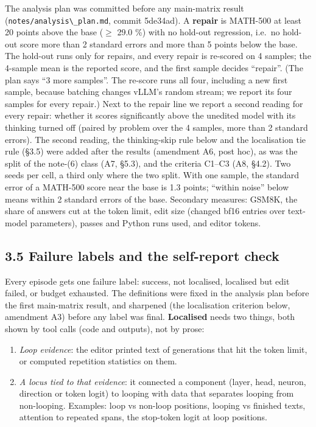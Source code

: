 \documentclass[
  10pt,
]{article}
\newcommand{\passthrough}[1]{#1}
\providecommand{\tightlist}{%
  \setlength{\itemsep}{0pt}\setlength{\parskip}{0pt}}
\begin{document}
The analysis plan was committed before any main-matrix result
(\passthrough{\lstinline!notes/analysis\_plan.md!}, commit 5de34ad). A
\textbf{repair} is MATH-500 at least 20 points above the base (\ensuremath{\geq} 29.0
\%) with no hold-out regression, i.e.~no hold-out score more than 2
standard errors and more than 5 points below the base. The hold-out runs
only for repairs, and every repair is re-scored on 4 samples; the
4-sample mean is the reported score, and the first sample decides
``repair''. (The plan says ``3 more samples''. The re-score runs all
four, including a new first sample, because batching changes vLLM's
random stream; we report its four samples for every repair.) Next to the
repair line we report a second reading for every repair: whether it
scores significantly above the unedited model with its thinking turned
off (paired by problem over the 4 samples, more than 2 standard errors).
The second reading, the thinking-skip rule below and the localisation
tie rule (\S{}3.5) were added after the results (amendment A6, post hoc),
as was the split of the note-(6) class (A7, \S{}5.3), and the criteria
C1--C3 (A8, \S{}4.2). Two seeds per cell, a third only where the two split.
With one sample, the standard error of a MATH-500 score near the base is
1.3 points; ``within noise'' below means within 2 standard errors of the
base. Secondary measures: GSM8K, the share of answers cut at the token
limit, edit size (changed bf16 entries over text-model parameters),
passes and Python runs used, and editor tokens.

\subsection{3.5 Failure labels and the self-report
check}\label{failure-labels-and-the-self-report-check}

Every episode gets one failure label: success, not localised, localised
but edit failed, or budget exhausted. The definitions were fixed in the
analysis plan before the first main-matrix result, and sharpened (the
localisation criterion below, amendment A3) before any label was final.
\textbf{Localised} needs two things, both shown by tool calls (code and
outputs), not by prose:

\begin{enumerate}
\def\labelenumi{\arabic{enumi}.}
\tightlist
\item
  \emph{Loop evidence}: the editor printed text of generations that hit
  the token limit, or computed repetition statistics on them.
\item
  \emph{A locus tied to that evidence}: it connected a component (layer,
  head, neuron, direction or token logit) to looping with data that
  separates looping from non-looping. Examples: loop vs non-loop
  positions, looping vs finished texts, attention to repeated spans, the
  stop-token logit at loop positions.
\end{enumerate}
\end{document}
